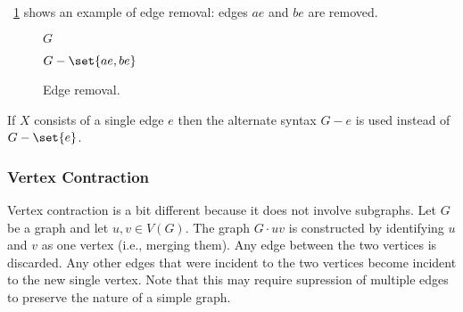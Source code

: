 \figurename~\ref{fig:eremove} shows an example of edge removal: edges \(ae\) and \(be\) are removed.

\begin{figure}[H]
  \begin{minipage}{2.75in}
    \centering

    \bigskip

    \(G\)
  \end{minipage}
  \begin{minipage}{2.75in}
    \centering

    \bigskip

    \(G-\set{ae,be}\)
  \end{minipage}
  \caption{Edge removal.}
  \label{fig:eremove}
\end{figure}

If \(X\) consists of a single edge \(e\) then the alternate syntax \(G-e\) is used instead of \(G-\set{e}\).

\subsubsection{Vertex Contraction}\label{sec:sub:sub:contract}

Vertex contraction is a bit different because it does not involve subgraphs.  Let \(G\) be a graph and let \(u,v\in
V(G)\).  The graph \(G\cdot uv\) is constructed by identifying \(u\) and \(v\) as one vertex (i.e., merging them).
Any edge between the two vertices is discarded.  Any other edges that were incident to the two vertices become
incident to the new single vertex.  Note that this may require supression of multiple edges to preserve the nature
of a simple graph.

